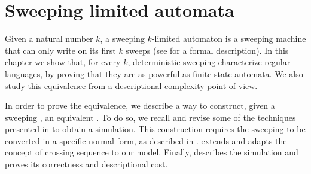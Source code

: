 \chapter{Sweeping limited automata}\label{ch:sweeping}
Given a natural number $k$, a sweeping $k$-limited automaton is a sweeping machine that can only write on its first $k$ sweeps (see  for a formal description).
In this chapter we show that, for every $k$, deterministic sweeping \kLAs characterize regular languages, by proving that they are as powerful as finite state automata. We also study this equivalence from a descriptional complexity point of view.

In order to prove the equivalence, we describe a way to construct, given a sweeping \kDLA, an equivalent \ONFA.
To do so, we recall and revise some of the techniques presented in  to obtain a simulation.
This construction requires the sweeping \kDLA to be converted in a specific normal form, as described in .
 extends and adapts the concept of crossing sequence to our model.
Finally,  describes the simulation and proves its correctness and descriptional cost.



